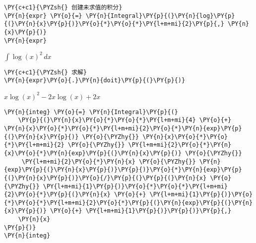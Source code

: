     

    \begin{tcolorbox}[breakable, size=fbox, boxrule=1pt, pad at break*=1mm,colback=cellbackground, colframe=cellborder]
\begin{Verbatim}[commandchars=\\\{\}]
\PY{c+c1}{\PYZsh{} 创建未求值的积分}
\PY{n}{expr} \PY{o}{=} \PY{n}{Integral}\PY{p}{(}\PY{n}{log}\PY{p}{(}\PY{n}{x}\PY{p}{)}\PY{o}{*}\PY{o}{*}\PY{l+m+mi}{2}\PY{p}{,} \PY{n}{x}\PY{p}{)}
\PY{n}{expr}
\end{Verbatim}
\end{tcolorbox}
 
            
    
    $\displaystyle \int \log{\left(x \right)}^{2}\, dx$

    

    \begin{tcolorbox}[breakable, size=fbox, boxrule=1pt, pad at break*=1mm,colback=cellbackground, colframe=cellborder]
\begin{Verbatim}[commandchars=\\\{\}]
\PY{c+c1}{\PYZsh{} 求解}
\PY{n}{expr}\PY{o}{.}\PY{n}{doit}\PY{p}{(}\PY{p}{)}
\end{Verbatim}
\end{tcolorbox}
 
            
    
    $\displaystyle x \log{\left(x \right)}^{2} - 2 x \log{\left(x \right)} + 2 x$

    

    \begin{tcolorbox}[breakable, size=fbox, boxrule=1pt, pad at break*=1mm,colback=cellbackground, colframe=cellborder]
\begin{Verbatim}[commandchars=\\\{\}]
\PY{n}{integ} \PY{o}{=} \PY{n}{Integral}\PY{p}{(}
    \PY{p}{(}\PY{n}{x}\PY{o}{*}\PY{o}{*}\PY{l+m+mi}{4} \PY{o}{+} \PY{n}{x}\PY{o}{*}\PY{o}{*}\PY{l+m+mi}{2}\PY{o}{*}\PY{n}{exp}\PY{p}{(}\PY{n}{x}\PY{p}{)} \PY{o}{\PYZhy{}} \PY{n}{x}\PY{o}{*}\PY{o}{*}\PY{l+m+mi}{2} \PY{o}{\PYZhy{}} \PY{l+m+mi}{2}\PY{o}{*}\PY{n}{x}\PY{o}{*}\PY{n}{exp}\PY{p}{(}\PY{n}{x}\PY{p}{)} \PY{o}{\PYZhy{}} 
     \PY{l+m+mi}{2}\PY{o}{*}\PY{n}{x} \PY{o}{\PYZhy{}} \PY{n}{exp}\PY{p}{(}\PY{n}{x}\PY{p}{)}\PY{p}{)}\PY{o}{*}\PY{n}{exp}\PY{p}{(}\PY{n}{x}\PY{p}{)}\PY{o}{/}\PY{p}{(}\PY{p}{(}\PY{n}{x} \PY{o}{\PYZhy{}} \PY{l+m+mi}{1}\PY{p}{)}\PY{o}{*}\PY{o}{*}\PY{l+m+mi}{2}\PY{o}{*}\PY{p}{(}\PY{n}{x} \PY{o}{+} \PY{l+m+mi}{1}\PY{p}{)}\PY{o}{*}\PY{o}{*}\PY{l+m+mi}{2}\PY{o}{*}\PY{p}{(}\PY{n}{exp}\PY{p}{(}\PY{n}{x}\PY{p}{)} \PY{o}{+} \PY{l+m+mi}{1}\PY{p}{)}\PY{p}{)}\PY{p}{,} 
    \PY{n}{x}
\PY{p}{)}
\PY{n}{integ}
\end{Verbatim}
\end{tcolorbox}
 
